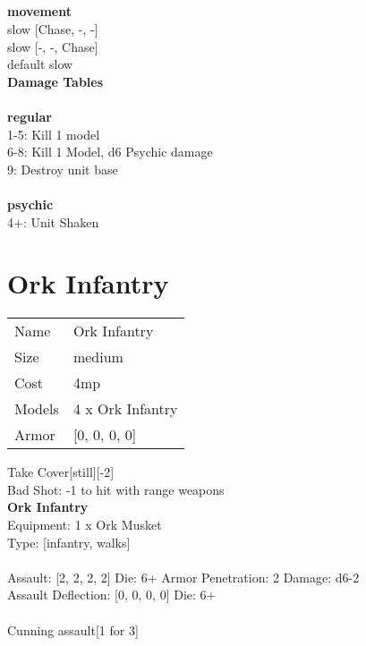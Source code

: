 \ \\

\ \\
 
\ \\




\ \\ {\bf movement } \\
slow [Chase, -, -] \\
slow [-, -, Chase] \\
default slow \\


{\bf Damage Tables} \\
\ \\ {\bf regular } \\
1-5: Kill 1 model \\
6-8: Kill 1 Model, d6 Psychic damage \\
9: Destroy unit base \\
\ \\ {\bf psychic } \\
4+: Unit Shaken \\










\pagebreak\pagebreak

\section{ Ork Infantry }

\begin{tabular}{ll}
  Name & Ork Infantry \\
  Size & medium\\
  Cost & 4mp\\
  Models & 4 x Ork Infantry\\
  Armor & [0, 0, 0, 0]\\
\end{tabular}

\noindent Take Cover[still][-2]\\ 
Bad Shot: -1 to hit with range weapons\\ 


{\bf Ork Infantry } \\
Equipment: 1 x Ork Musket \\
Type: [infantry, walks] \\
\ \\
Assault: [2, 2, 2, 2] Die: 6+ Armor Penetration: 2 Damage: d6-2 \\
Assault Deflection: [0, 0, 0, 0] Die: 6+\\
\\ 
Cunning assault[1 for 3]\\ 
 
